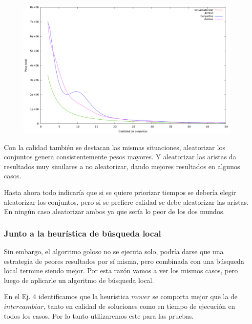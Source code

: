 \vspace*{0.5cm}

\vspace*{0.5cm}

\begin{figure}[h]
  \begin{center}
    \includegraphics[scale=0.35]{imagenes/grasp-goloso-k-peso.png}
  \end{center}
\end{figure}

\vspace*{0.5cm}

Con la calidad también se destacan las mismas situaciones, aleatorizar los
conjuntos genera consistentemente pesos mayores. Y aleatorizar las aristas da
resultados muy similares a no aleatorizar, dando mejores resultados en algunos
casos.

Hasta ahora todo indicaría que si se quiere priorizar tiempos se debería
elegir aleatorizar los conjuntos, pero si se prefiere calidad se debe
aleatorizar las aristas.
En ningún caso aleatorizar ambos ya que sería lo peor de los dos mundos.

\subsubsection{Junto a la heurística de búsqueda local}

Sin embargo, el algoritmo goloso no se ejecuta solo, podría darse que
una estrategia de peores resultados por sí misma, pero combinada con una
búsqueda local termine siendo mejor. Por esta razón vamos a ver los mismos
casos, pero luego de aplicarle un algoritmo de búsqueda local.

En el Ej. 4 identificamos que la heurística $mover$ se comporta mejor que
la de $intercambiar$, tanto en calidad de soluciones como en tiempo de
ejecución en todos los casos. Por lo tanto utilizaremos este para las pruebas.

